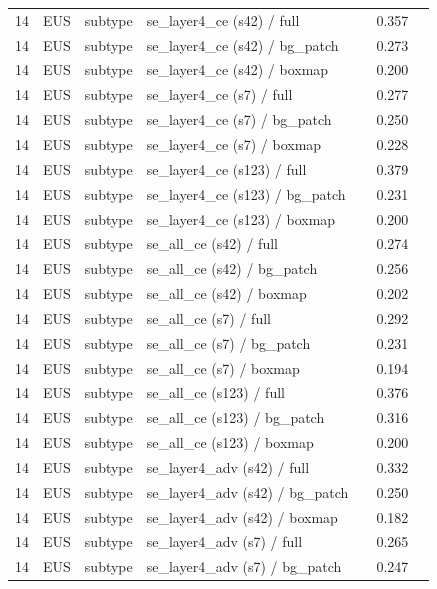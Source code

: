 \begin{longtable}{cL{1.1cm}L{1.5cm}L{5.6cm}ccc}
14 & EUS & subtype & se\_layer4\_ce (s42) / full & \nl{} & 0.357 & \nl{} \\
14 & EUS & subtype & se\_layer4\_ce (s42) / bg\_patch & \nl{} & 0.273 & \nl{} \\
14 & EUS & subtype & se\_layer4\_ce (s42) / boxmap & \nl{} & 0.200 & \nl{} \\
14 & EUS & subtype & se\_layer4\_ce (s7) / full & \nl{} & 0.277 & \nl{} \\
14 & EUS & subtype & se\_layer4\_ce (s7) / bg\_patch & \nl{} & 0.250 & \nl{} \\
14 & EUS & subtype & se\_layer4\_ce (s7) / boxmap & \nl{} & 0.228 & \nl{} \\
14 & EUS & subtype & se\_layer4\_ce (s123) / full & \nl{} & 0.379 & \nl{} \\
14 & EUS & subtype & se\_layer4\_ce (s123) / bg\_patch & \nl{} & 0.231 & \nl{} \\
14 & EUS & subtype & se\_layer4\_ce (s123) / boxmap & \nl{} & 0.200 & \nl{} \\
14 & EUS & subtype & se\_all\_ce (s42) / full & \nl{} & 0.274 & \nl{} \\
14 & EUS & subtype & se\_all\_ce (s42) / bg\_patch & \nl{} & 0.256 & \nl{} \\
14 & EUS & subtype & se\_all\_ce (s42) / boxmap & \nl{} & 0.202 & \nl{} \\
14 & EUS & subtype & se\_all\_ce (s7) / full & \nl{} & 0.292 & \nl{} \\
14 & EUS & subtype & se\_all\_ce (s7) / bg\_patch & \nl{} & 0.231 & \nl{} \\
14 & EUS & subtype & se\_all\_ce (s7) / boxmap & \nl{} & 0.194 & \nl{} \\
14 & EUS & subtype & se\_all\_ce (s123) / full & \nl{} & 0.376 & \nl{} \\
14 & EUS & subtype & se\_all\_ce (s123) / bg\_patch & \nl{} & 0.316 & \nl{} \\
14 & EUS & subtype & se\_all\_ce (s123) / boxmap & \nl{} & 0.200 & \nl{} \\
14 & EUS & subtype & se\_layer4\_adv (s42) / full & \nl{} & 0.332 & \nl{} \\
14 & EUS & subtype & se\_layer4\_adv (s42) / bg\_patch & \nl{} & 0.250 & \nl{} \\
14 & EUS & subtype & se\_layer4\_adv (s42) / boxmap & \nl{} & 0.182 & \nl{} \\
14 & EUS & subtype & se\_layer4\_adv (s7) / full & \nl{} & 0.265 & \nl{} \\
14 & EUS & subtype & se\_layer4\_adv (s7) / bg\_patch & \nl{} & 0.247 & \nl{} \\

\end{longtable}
